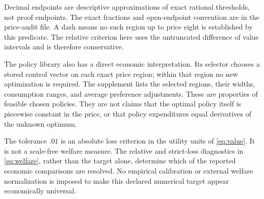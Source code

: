 \begin{table}[t]\centering\small
\caption{Price regions in which welfare losses are separated}\label{tab:regions}

\par\smallskip\footnotesize Decimal endpoints are descriptive approximations of exact rational thresholds, not proof endpoints. The exact fractions and open-endpoint convention are in the price-audit file. A dash means no such region up to price eight is established by this predicate. The relative criterion here uses the untruncated difference of value intervals and is therefore conservative.
\end{table}

The policy library also has a direct economic interpretation. Its selector chooses a stored control vector on each exact price region; within that region no new optimization is required. The supplement lists the selected regions, their widths, consumption ranges, and average preference adjustments. These are properties of feasible chosen policies. They are not claims that the optimal policy itself is piecewise constant in the price, or that policy expenditures equal derivatives of the unknown optimum.

The tolerance $.01$ is an absolute loss criterion in the utility units of \eqref{eq:value}. It is not a scale-free welfare measure. The relative and strict-loss diagnostics in \eqref{eq:welfare}, rather than the target alone, determine which of the reported economic comparisons are resolved. No empirical calibration or external welfare normalization is imposed to make this declared numerical target appear economically universal.

